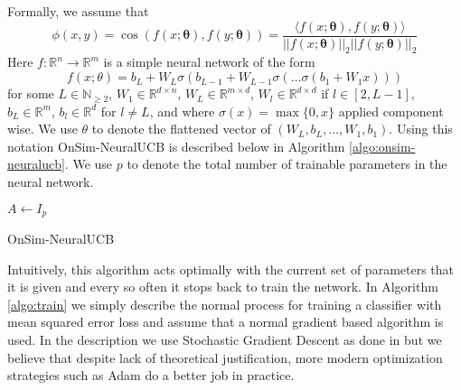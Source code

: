 \documentclass{article}
\begin{document}
Formally, we assume that
\[ \phi(x,y) = \cos\left(f(x;\mathbf{\theta}), f(y;\mathbf{\theta})\right) = \frac{\langle f(x;\mathbf{\theta}), f(y;\mathbf{\theta}) \rangle}{||f(x;\mathbf{\theta})||_2 ||f(y;\mathbf{\theta})||_2}\]
Here $f: \mathbb{R}^n \to \mathbb{R}^m$ is a simple neural network of the form
\[ f(x; \theta) = b_L + W_{L} \sigma\left(b_{L-1} +  W_{L-1} \sigma\left( \dots \sigma\left(b_1 + W_1 x\right)\right) \right)\]
for some $L \in \mathbb{N}_{\geq 2}$, $W_1 \in \mathbb{R}^{d \times n}$, $W_{L} \in \mathbb{R}^{m \times d}$, $W_{l} \in \mathbb{R}^{d\times d}$ if $l \in [2, L-1]$, $b_L \in \mathbb{R}^m$, $b_l \in \mathbb{R}^d$ for $l \neq L$, and where $\sigma(x) = \max\{0, x\}$ applied component wise. We use $\theta$ to denote the flattened vector of $(W_L, b_L, \dots, W_1, b_1)$.
Using this notation OnSim-NeuralUCB is described below in Algorithm \ref{algo:onsim-neuralucb}. We use $p$ to denote the total number of trainable parameters in the neural network.

\begin{algorithm}
  \label{algo:onsim-neuralucb}
    $A \gets I_{p}$\;
    \caption{OnSim-NeuralUCB}
  \end{algorithm}

Intuitively, this algorithm acts optimally with the current set of parameters that it is given and every so often it stops back to train the network. In Algorithm \ref{algo:train} we simply describe the normal process for training a classifier with mean squared error loss and assume that a normal gradient based algorithm is used.
In the description we use Stochastic Gradient Descent as done in \cite{neuralucb} but we believe that despite lack of theoretical justification, more modern optimization strategies such as Adam \cite{adam} do a better job in practice.
\end{document}
